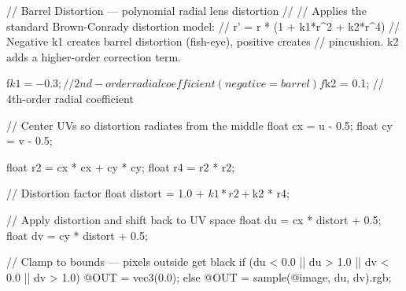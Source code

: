 // Barrel Distortion — polynomial radial lens distortion
//
// Applies the standard Brown-Conrady distortion model:
//   r' = r * (1 + k1*r^2 + k2*r^4)
// Negative k1 creates barrel distortion (fish-eye), positive creates
// pincushion. k2 adds a higher-order correction term.

f$k1 = -0.3;    // 2nd-order radial coefficient (negative = barrel)
f$k2 = 0.1;     // 4th-order radial coefficient

// Center UVs so distortion radiates from the middle
float cx = u - 0.5;
float cy = v - 0.5;

float r2 = cx * cx + cy * cy;
float r4 = r2 * r2;

// Distortion factor
float distort = 1.0 + $k1 * r2 + $k2 * r4;

// Apply distortion and shift back to UV space
float du = cx * distort + 0.5;
float dv = cy * distort + 0.5;

// Clamp to bounds — pixels outside get black
if (du < 0.0 || du > 1.0 || dv < 0.0 || dv > 1.0) {
    @OUT = vec3(0.0);
} else {
    @OUT = sample(@image, du, dv).rgb;
}
